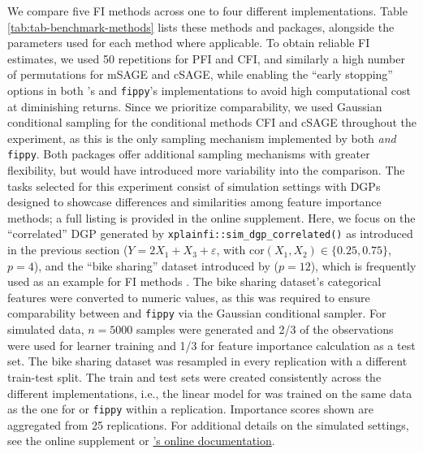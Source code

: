 We compare five FI methods across one to four different implementations.
Table \ref{tab:tab-benchmark-methods} lists these methods and packages, alongside the parameters used for each method where applicable.
To obtain reliable FI estimates, we used 50 repetitions for PFI and CFI, and similarly a high number of permutations for mSAGE and cSAGE, while enabling the ``early stopping'' options in both 's and \texttt{fippy}'s implementations to avoid high computational cost at diminishing returns.
Since we prioritize comparability, we used Gaussian conditional sampling for the conditional methods CFI and cSAGE throughout the experiment, as this is the only sampling mechanism implemented by both  \emph{and} \texttt{fippy}.
Both packages offer additional sampling mechanisms with greater flexibility, but would have introduced more variability into the comparison.
The tasks selected for this experiment consist of simulation settings with DGPs designed to showcase differences and similarities among feature importance methods; a full listing is provided in the online supplement.
Here, we focus on the ``correlated'' DGP generated by \texttt{xplainfi::sim\_dgp\_correlated()} as introduced in the previous section (\(Y = 2X_1 + X_3 + \varepsilon\), with \(\mathrm{cor}(X_1, X_2) \in \{0.25, 0.75\}\), \(p = 4\)), and the ``bike sharing'' dataset introduced by \citet{fanaee-t2014eventlabeling} (\(p = 12\)), which is frequently used as an example for FI methods \citep[e.g.,][]{covert2020understandingglobalb, blesch2025conditionalfeaturea}.
The bike sharing dataset's categorical features were converted to numeric values, as this was required to ensure comparability between  and \texttt{fippy} via the Gaussian conditional sampler.
For simulated data, \(n = 5000\) samples were generated and 2/3 of the observations were used for learner training and 1/3 for feature importance calculation as a test set.
The bike sharing dataset was resampled in every replication with a different train-test split.
The train and test sets were created consistently across the different implementations, i.e., the linear model for  was trained on the same data as the one for  or \texttt{fippy} within a replication.
Importance scores shown are aggregated from 25 replications.
For additional details on the simulated settings, see the online supplement or \href{https://mlr-org.github.io/xplainfi/articles/simulation-settings.html}{'s online documentation}.

